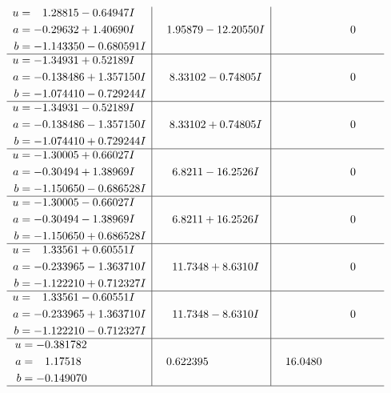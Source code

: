 \documentclass[1p]{elsarticle_modified}
\theoremstyle{definition}
\begin{document}
$$\begin{array}{c|c|c}
\begin{aligned}
u &= \phantom{-}1.28815 - 0.64947 I \\
a &= -0.29632 + 1.40690 I \\
b &= -1.143350 - 0.680591 I\end{aligned}
 & \phantom{-}1.95879 - 12.20550 I & \phantom{-0.000000 } 0 \\ \hline\begin{aligned}
u &= -1.34931 + 0.52189 I \\
a &= -0.138486 + 1.357150 I \\
b &= -1.074410 - 0.729244 I\end{aligned}
 & \phantom{-}8.33102 - 0.74805 I & \phantom{-0.000000 } 0 \\ \hline\begin{aligned}
u &= -1.34931 - 0.52189 I \\
a &= -0.138486 - 1.357150 I \\
b &= -1.074410 + 0.729244 I\end{aligned}
 & \phantom{-}8.33102 + 0.74805 I & \phantom{-0.000000 } 0 \\ \hline\begin{aligned}
u &= -1.30005 + 0.66027 I \\
a &= -0.30494 + 1.38969 I \\
b &= -1.150650 - 0.686528 I\end{aligned}
 & \phantom{-}6.8211 - 16.2526 I & \phantom{-0.000000 } 0 \\ \hline\begin{aligned}
u &= -1.30005 - 0.66027 I \\
a &= -0.30494 - 1.38969 I \\
b &= -1.150650 + 0.686528 I\end{aligned}
 & \phantom{-}6.8211 + 16.2526 I & \phantom{-0.000000 } 0 \\ \hline\begin{aligned}
u &= \phantom{-}1.33561 + 0.60551 I \\
a &= -0.233965 - 1.363710 I \\
b &= -1.122210 + 0.712327 I\end{aligned}
 & \phantom{-}11.7348 + 8.6310 I & \phantom{-0.000000 } 0 \\ \hline\begin{aligned}
u &= \phantom{-}1.33561 - 0.60551 I \\
a &= -0.233965 + 1.363710 I \\
b &= -1.122210 - 0.712327 I\end{aligned}
 & \phantom{-}11.7348 - 8.6310 I & \phantom{-0.000000 } 0 \\ \hline\begin{aligned}
u &= -0.381782\phantom{ +0.000000I} \\
a &= \phantom{-}1.17518\phantom{ +0.000000I} \\
b &= -0.149070\phantom{ +0.000000I}\end{aligned}
 & \phantom{-}0.622395\phantom{ +0.000000I} & \phantom{-}16.0480\phantom{ +0.000000I}\\
 \hline 
 \end{array}$$\newpage\newpage\renewcommand{\arraystretch}{1}
\end{document}
